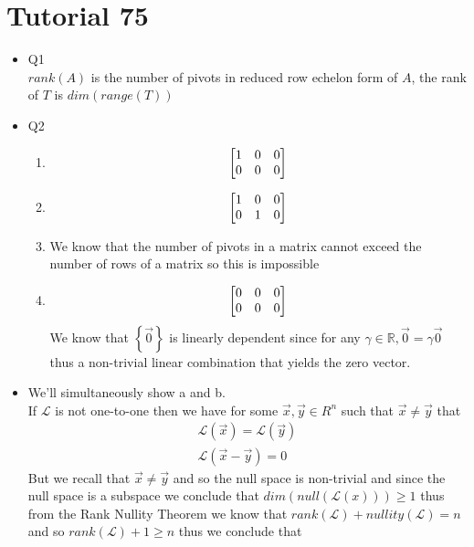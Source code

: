 \documentclass[11pt]{book}
\begin{document}
\section{Tutorial 75}%
\label{sec:tutorial_75}

\begin{itemize}
    \item Q1\\
    $\mathit{rank} \left(A\right) $ is the number of pivots in reduced row echelon form of $A$, the rank of $T$ is $\mathit{dim} \left(\mathit{range} \left(T\right) \right) $ 
    \item Q2
        \begin{enumerate}[label=\alph*)]
            \item 
                \[
                    \begin{bmatrix} 1 & 0 & 0 \\ 0 & 0 & 0 \end{bmatrix}
                \]
            \item 
                \[
                    \begin{bmatrix} 1 & 0 & 0 \\ 0 & 1 & 0 \end{bmatrix}
                \]
            \item We know that the number of pivots in a matrix cannot exceed the number of rows of a matrix so this is impossible
            \item 
                \[
                \begin{bmatrix} 0 & 0 & 0 \\ 0 & 0 & 0 \end{bmatrix}
                \]
                We know that $\left\{ \vec{0}  \right\} $ is linearly dependent since for any $\gamma \in \mathbb{R}, \vec{0} = \gamma \vec{0} $ thus a non-trivial linear combination that yields the zero vector. 
        \end{enumerate}
    \item We'll simultaneously show a and b. \\
    If $\mathcal{L} $ is not one-to-one then we have for some $\vec{x}, \vec{y}  \in R^{n} $ such that $\vec{x} \neq \vec{y} $ that
    \begin{gather*}
        \mathcal{L}\left(\vec{x} \right) = \mathcal{L}\left(\vec{y}\right) \\
        \mathcal{L}\left(\vec{x}  - \vec{y} \right) = 0
    \end{gather*}
    But we recall that $\vec{x} \neq \vec{y} $ and so the null space is non-trivial and since the null space is a subspace we conclude that $\mathit{dim} \left(\mathit{null} \left(\mathcal{L}\left(x\right) \right) \right) \ge 1$ thus from the Rank Nullity Theorem we know that $\mathit{rank} \left(\mathcal{L} \right)  + nullity\left( \mathcal{L}  \right) = n$  and so $\mathit{rank} \left(\mathcal{L}\right)  + 1 \ge n $ thus we conclude that

\end{itemize}
\end{document}
